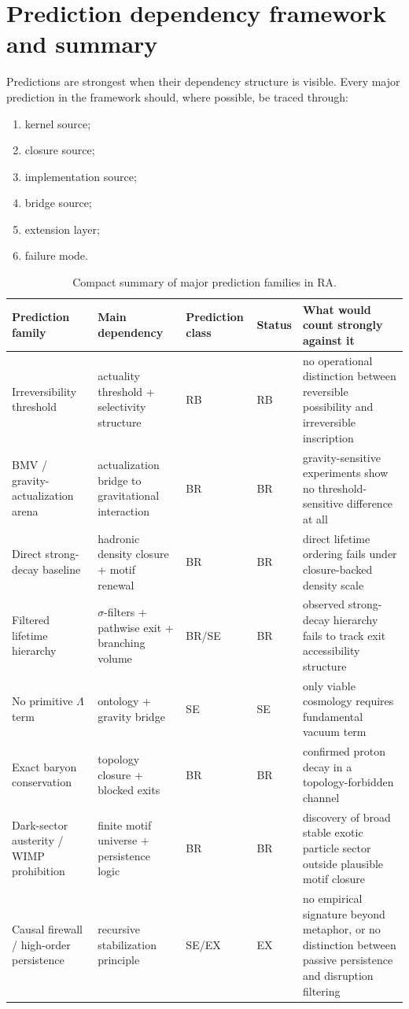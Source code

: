 \documentclass[11pt]{article}
\begin{document}
\section{Prediction dependency framework and summary}
Predictions are strongest when their dependency structure is visible. Every major prediction in the framework should, where possible, be traced through:
\begin{enumerate}[label=\arabic*.]
    \item kernel source;
    \item closure source;
    \item implementation source;
    \item bridge source;
    \item extension layer;
    \item failure mode.
\end{enumerate}

\begin{table}[htbp]
\centering
\caption{Compact summary of major prediction families in RA.}
\begin{tabular}{>{\raggedright\arraybackslash}p{3.1cm} >{\raggedright\arraybackslash}p{2.1cm} >{\raggedright\arraybackslash}p{2.2cm} >{\raggedright\arraybackslash}p{1.5cm} >{\raggedright\arraybackslash}p{4.2cm}}
\toprule
Prediction family & Main dependency & Prediction class & Status & What would count strongly against it \\
\midrule
Irreversibility threshold & actuality threshold + selectivity structure & RB & RB & no operational distinction between reversible possibility and irreversible inscription \\
BMV / gravity-actualization arena & actualization bridge to gravitational interaction & BR & BR & gravity-sensitive experiments show no threshold-sensitive difference at all \\
Direct strong-decay baseline & hadronic density closure + motif renewal & BR & BR & direct lifetime ordering fails under closure-backed density scale \\
Filtered lifetime hierarchy & $\sigma$-filters + pathwise exit + branching volume & BR/SE & BR & observed strong-decay hierarchy fails to track exit accessibility structure \\
No primitive $\Lambda$ term & ontology + gravity bridge & SE & SE & only viable cosmology requires fundamental vacuum term \\
Exact baryon conservation & topology closure + blocked exits & BR & BR & confirmed proton decay in a topology-forbidden channel \\
Dark-sector austerity / WIMP prohibition & finite motif universe + persistence logic & BR & BR & discovery of broad stable exotic particle sector outside plausible motif closure \\
Causal firewall / high-order persistence & recursive stabilization principle & SE/EX & EX & no empirical signature beyond metaphor, or no distinction between passive persistence and disruption filtering \\
\bottomrule
\end{tabular}
\end{table}
\end{document}
